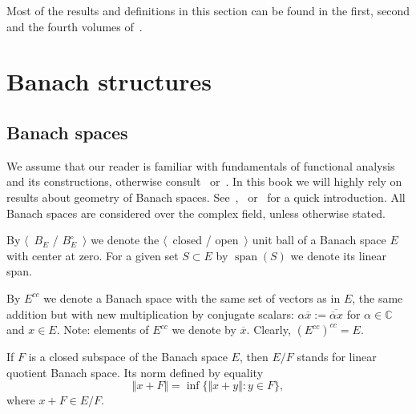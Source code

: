 Most of the results and definitions in this section can be found in the first,
second and the fourth volumes of~\cite{FremMeasTh}.


\section{
  Banach structures}\label{SectionBanachStructures}


\subsection{
  Banach spaces}\label{SubSectionBanachSpaces}

We assume that our reader is familiar with fundamentals of functional analysis
and its constructions, otherwise consult~\cite{HelLectAndExOnFuncAn}
or~\cite{ConwACoursInFuncAn}. In this book we will highly rely on results about
geometry of Banach spaces.
See~\cite{CarothShortCourseBanSp},~\cite{KalAlbTopicsBanSpTh}
or~\cite{FabHabBanSpTh} for a quick introduction. All Banach spaces are
considered over the complex field, unless otherwise stated. 

By $\langle$~$B_E$ / $B_E^\circ$~$\rangle$ we denote the $\langle$~closed /
open~$\rangle$ unit ball of a Banach space $E$ with center at zero. For a given 
set $S\subset E$ by $\operatorname{span}(S)$ we denote its linear span. 

By $E^{cc}$ we denote a Banach space with the same set of vectors as in $E$, the
same addition but with new multiplication by conjugate scalars:  $\alpha
\overline{x}:=\overline{\overline{\alpha}x}$ for $\alpha\in\mathbb{C}$ 
and $x\in E$. Note: elements of $E^{cc}$ we denote by $\overline{x}$. Clearly,
${(E^{cc})}^{cc}=E$.

If $F$ is a closed subspace of the Banach space $E$, then $E/F$ stands for 
linear quotient Banach space. Its norm defined by equality 
$$
\Vert x+F\Vert=\inf \{\Vert x+y\Vert: y\in F \},
$$
where $x+F\in E/F$.

